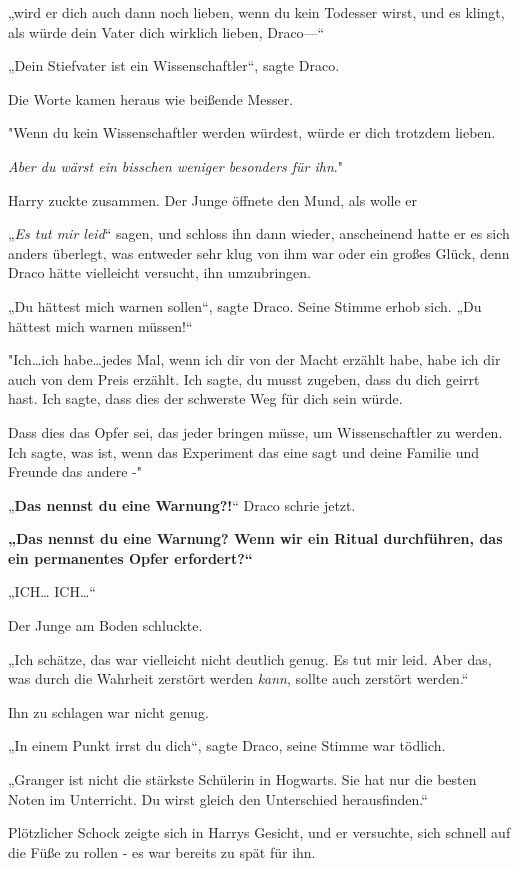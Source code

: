 {„wird er dich auch dann noch lieben, wenn du kein Todesser wirst, und es klingt, als würde dein Vater dich wirklich lieben, Draco—“

„Dein Stiefvater ist ein Wissenschaftler“, sagte Draco.

Die Worte kamen heraus wie beißende Messer.

"Wenn du kein Wissenschaftler werden würdest, würde er dich trotzdem lieben.

\emph{Aber du wärst ein bisschen weniger besonders für ihn}."

Harry zuckte zusammen. Der Junge öffnete den Mund, als wolle er

„\emph{Es tut mir leid}“ sagen, und schloss ihn dann wieder, anscheinend hatte er es sich anders überlegt, was entweder sehr klug von ihm war oder ein großes Glück, denn Draco hätte vielleicht versucht, ihn umzubringen.

„Du hättest mich warnen sollen“, sagte Draco. Seine Stimme erhob sich. „Du hättest mich warnen müssen!“

"Ich…ich habe…jedes Mal, wenn ich dir von der Macht erzählt habe, habe ich dir auch von dem Preis erzählt. Ich sagte, du musst zugeben, dass du dich geirrt hast. Ich sagte, dass dies der schwerste Weg für dich sein würde.

Dass dies das Opfer sei, das jeder bringen müsse, um Wissenschaftler zu werden. Ich sagte, was ist, wenn das Experiment das eine sagt und deine Familie und Freunde das andere -"

„\textbf{Das nennst du eine Warnung?!}“ Draco schrie jetzt.

\textbf{„Das nennst du eine Warnung? Wenn wir ein Ritual durchführen, das ein permanentes Opfer erfordert?“}

„ICH… ICH…“

Der Junge am Boden schluckte.

„Ich schätze, das war vielleicht nicht deutlich genug. Es tut mir leid. Aber das, was durch die Wahrheit zerstört werden \emph{kann}, sollte auch zerstört werden.“

Ihn zu schlagen war nicht genug.

„In einem Punkt irrst du dich“, sagte Draco, seine Stimme war tödlich.

„Granger ist nicht die stärkste Schülerin in Hogwarts. Sie hat nur die besten Noten im Unterricht. Du wirst gleich den Unterschied herausfinden.“

Plötzlicher Schock zeigte sich in Harrys Gesicht, und er versuchte, sich schnell auf die Füße zu rollen - es war bereits zu spät für ihn.

}
